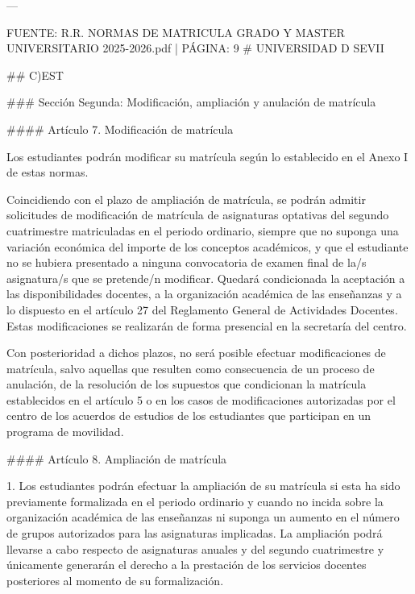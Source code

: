 \documentclass{article}
\begin{document}
\begin{itemize}
\begin{itemize}
\begin{scriptsize}
                  ---

                  FUENTE: R.R. NORMAS DE MATRICULA GRADO Y MASTER UNIVERSITARIO 2025-2026.pdf | PÁGINA: 9
                  \# UNIVERSIDAD D SEVII

                  \#\# C)EST

                  \#\#\# Sección Segunda: Modificación, ampliación y anulación de matrícula

                  \#\#\#\# Artículo 7. Modificación de matrícula

                  Los estudiantes podrán modificar su matrícula según lo establecido en el Anexo I de estas normas.

                  Coincidiendo con el plazo de ampliación de matrícula, se podrán admitir solicitudes de modificación de matrícula de asignaturas optativas del segundo cuatrimestre matriculadas en el periodo ordinario, siempre que no suponga una variación económica del importe de los conceptos académicos, y que el estudiante no se hubiera presentado a ninguna convocatoria de examen final de la/s asignatura/s que se pretende/n modificar. Quedará condicionada la aceptación a las disponibilidades docentes, a la organización académica de las enseñanzas y a lo dispuesto en el artículo 27 del Reglamento General de Actividades Docentes. Estas modificaciones se realizarán de forma presencial en la secretaría del centro.

                  Con posterioridad a dichos plazos, no será posible efectuar modificaciones de matrícula, salvo aquellas que resulten como consecuencia de un proceso de anulación, de la resolución de los supuestos que condicionan la matrícula establecidos en el artículo 5 o en los casos de modificaciones autorizadas por el centro de los acuerdos de estudios de los estudiantes que participan en un programa de movilidad.

                  \#\#\#\# Artículo 8. Ampliación de matrícula

                  1. Los estudiantes podrán efectuar la ampliación de su matrícula si esta ha sido previamente formalizada en el periodo ordinario y cuando no incida sobre la organización académica de las enseñanzas ni suponga un aumento en el número de grupos autorizados para las asignaturas implicadas. La ampliación podrá llevarse a cabo respecto de asignaturas anuales y del segundo cuatrimestre y únicamente generarán el derecho a la prestación de los servicios docentes posteriores al momento de su formalización.


\end{scriptsize}
\end{itemize}
\end{itemize}
\end{document}
